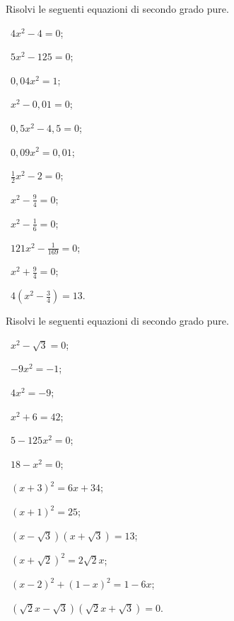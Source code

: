 \begin{esercizio}[\Ast]
 \label{ese:3.3}
Risolvi le seguenti equazioni di secondo grado pure.
\begin{multicols}{3}
 \begin{enumeratea}
 \item~$4 x^{2} - 4 = 0$;
 \item~$5 x^{2} - 125 = 0$;
 \item~$0,04 x^{2} = 1$;
 \item~$x^{2} - 0,01 = 0$;
 \item~$0,5 x^{2} - 4,5 = 0$;
 \item~$0,09 x^{2} = 0,01$;
 \item~$\frac{1}{2} x^{2} - 2 = 0$;
 \item~$x^{2} - \frac{9}{4} = 0$;
 \item~$x^{2} - \frac{1}{6} = 0$;
 \item~$121 x^{2} - \frac{1}{169} = 0$;
 \item~$x^{2} + \frac{9}{4} = 0$;
 \item~$4 \left(x^{2}-\frac{3}{4}\right)= 13$.
 \end{enumeratea}
 \end{multicols}
\end{esercizio}

\begin{esercizio}[\Ast]
 \label{ese:3.4}
Risolvi le seguenti equazioni di secondo grado pure.
\begin{multicols}{2}
 \begin{enumeratea}
 \item~$x^{2} - \sqrt{3} = 0$;
 \item~$- 9 x^{2} = - 1$;
 \item~$4 x^{2} = - 9$;
 \item~$x^{2} + 6 = 42$;
 \item~$5 - 125 x^{2} = 0$;
 \item~$18 - x^{2} = 0$;
 \item~$(x + 3)^{2} = 6 x + 34$;
 \item~$(x + 1)^{2} = 25$;
 \item~$(x - \sqrt{3}) (x + \sqrt{3}) = 13$;
 \item~$(x + \sqrt{2})^{2} = 2 \sqrt{2} x$;
 \item~$(x - 2)^{2} + (1 - x)^{2} = 1 - 6x$;
 \item~$(\sqrt{2} x - \sqrt{3}) (\sqrt{2} x + \sqrt{3}) = 0$.
 \end{enumeratea}
 \end{multicols}
\end{esercizio}

